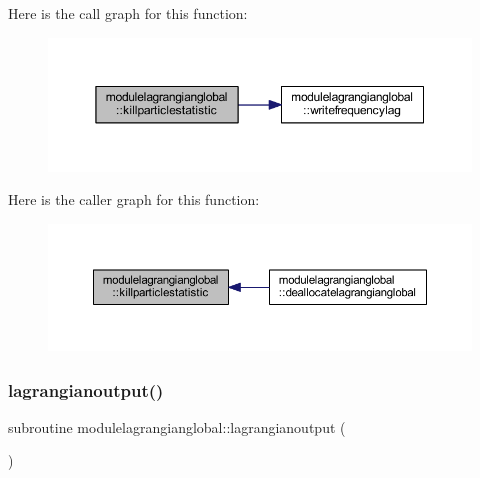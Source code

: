 Here is the call graph for this function\+:\nopagebreak
\begin{figure}[H]
\begin{center}
\leavevmode
\includegraphics[width=350pt]{namespacemodulelagrangianglobal_a3ce834e6c05495002ac0eda8b4096d0e_cgraph}
\end{center}
\end{figure}
Here is the caller graph for this function\+:\nopagebreak
\begin{figure}[H]
\begin{center}
\leavevmode
\includegraphics[width=350pt]{namespacemodulelagrangianglobal_a3ce834e6c05495002ac0eda8b4096d0e_icgraph}
\end{center}
\end{figure}
\mbox{\label{namespacemodulelagrangianglobal_a3e9da0dad79c6c6965b34c4f0d9232a0}} 
\subsubsection{\texorpdfstring{lagrangianoutput()}{lagrangianoutput()}}
{\footnotesize\ttfamily subroutine modulelagrangianglobal\+::lagrangianoutput (\begin{DoxyParamCaption}{ }\end{DoxyParamCaption})\hspace{0.3cm}{\ttfamily [private]}}

